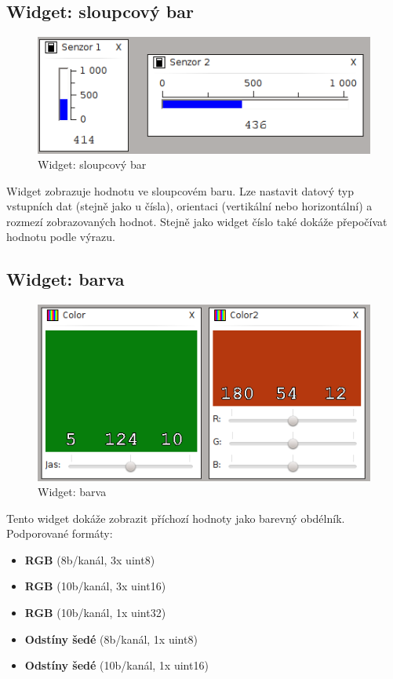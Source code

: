 \documentclass[12pt, a4paper, oneside]{article}
\begin{document}
\subsection{Widget: sloupcový bar}
\begin{figure}[H]
\begin{center}
\includegraphics{img/w_bar.png}
\caption{Widget: sloupcový bar}
\end{center}
\end{figure}
Widget zobrazuje hodnotu ve sloupcovém baru. Lze nastavit datový typ vstupních dat (stejně jako u čísla), orientaci (vertikální nebo horizontální) a rozmezí zobrazovaných hodnot. Stejně jako widget číslo také dokáže přepočívat hodnotu podle výrazu.

\subsection{Widget: barva}
\begin{figure}[H]
\begin{center}
\includegraphics{img/w_col.png}
\caption{Widget: barva}
\end{center}
\end{figure}
Tento widget dokáže zobrazit příchozí hodnoty jako barevný obdélník. Podporované formáty:
\begin{itemize}
    \item {\bf RGB} (8b/kanál, 3x uint8)
    \item {\bf RGB} (10b/kanál, 3x uint16)
    \item {\bf RGB} (10b/kanál, 1x uint32)
    \item {\bf Odstíny šedé} (8b/kanál, 1x uint8)
    \item {\bf Odstíny šedé} (10b/kanál, 1x uint16)
\end{itemize}
\end{document}
